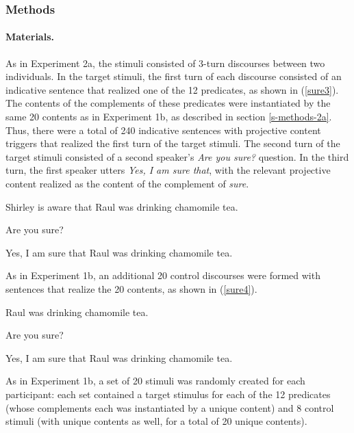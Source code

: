 \documentclass[11pt,fleqn]{article}
\newcommand{\6}{\mbox{$[\hspace*{-.6mm}[$}}
\newcommand{\9}{\mbox{$]\hspace*{-.6mm}]$}}
\begin{document}
\subsubsection{Methods}


\paragraph{Materials.} As in Experiment 2a, the stimuli consisted of 3-turn discourses between two individuals. In the target stimuli, the first turn of each discourse consisted of an indicative sentence that realized one of the 12 predicates, as shown in (\ref{sure3}). The contents of the complements of these predicates were instantiated by the same 20 contents as in Experiment 1b, as described in section \ref{s-methods-2a}. Thus, there were a total of 240 indicative sentences with projective content triggers that realized the first turn of the target stimuli. The second turn of the target stimuli consisted of a second speaker's {\em Are you sure?} question. In the third turn, the first speaker utters {\em Yes, I am sure that}, with the relevant projective content realized as the content of the complement of {\em sure}. 

\begin{exe}
\ex\label{sure3}
\begin{xlist}
 Shirley is aware that Raul was drinking chamomile tea.

 Are you sure?

 Yes, I am sure that Raul was drinking chamomile tea.
\end{xlist}
\end{exe}

As in Experiment 1b, an additional 20 control discourses were formed with sentences that realize the 20 contents, as shown in (\ref{sure4}).

\begin{exe}
\ex\label{sure4}
\begin{xlist}
 Raul was drinking chamomile tea.

 Are you sure?

 Yes, I am sure that Raul was drinking chamomile tea.
\end{xlist}
\end{exe}
As in Experiment 1b, a set of 20 stimuli was randomly created for each participant: each set contained a target stimulus for each of the 12 predicates (whose complements each was instantiated by a unique content) and 8 control stimuli (with unique contents as well, for a total of 20 unique contents). 
\end{document}
